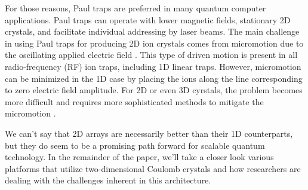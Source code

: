 For those reasons, Paul traps are preferred in many quantum computer applications. Paul traps can operate with lower magnetic fields, stationary 2D crystals, and facilitate individual addressing by laser beams. The main challenge in using Paul traps for producing 2D ion crystals comes from micromotion due to the oscillating applied electric field \cite{YeWang}. This type of driven motion is present in all radio-frequency (RF) ion traps, including 1D linear traps. However, micromotion can be minimized in the 1D case by placing the ions along the line corresponding to zero electric field amplitude. For 2D or even 3D cyrstals, the problem becomes more difficult and requires more sophisticated methods to mitigate the micromotion \cite{Kato2}.

We can't say that 2D arrays are necessarily better than their 1D counterparts, but they do seem to be a promising path forward for scalable quantum technology. In the remainder of the paper, we'll take a closer look various platforms that utilize two-dimensional Coulomb crystals and how researchers are dealing with the challenges inherent in this architecture.